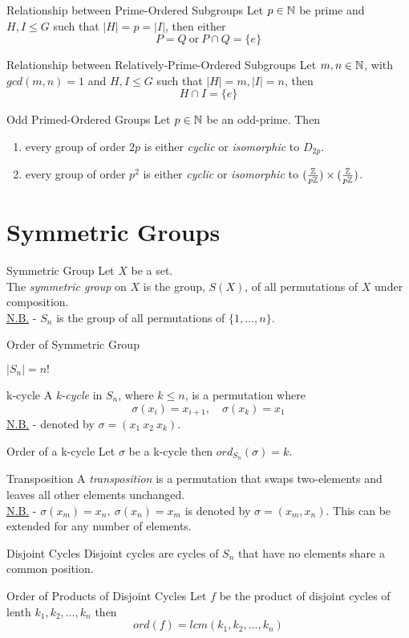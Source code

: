 \documentclass[11pt,a4paper]{article}
\begin{document}
\subtitle{Proposition 12.6 - }{Relationship between Prime-Ordered Subgroups}
Let $p \in \mathbb{N}$ be prime and $H, I \leq G$ such that $|H| = p = |I|$, then either
$$P = Q \mathrm{\ or \ } P \cap Q = \{e\} $$

\subtitle{Proposition 12.7 - }{Relationship between Relatively-Prime-Ordered Subgroups}
Let $m, n \in \mathbb{N}$, with $gcd(m,n) = 1$ and $H, I \leq G$ such that $|H| = m, |I| = n$, then
$$H \cap I = \{e\}$$

\subtitle{Theorem 12.8 - }{Odd Primed-Ordered Groups}
Let $p \in \mathbb{N}$ be an odd-prime. Then
\begin{enumerate}[label=\roman*)]
  \item every group of order $2p$ is either \textit{cyclic} or \textit{isomorphic} to $D_{2p}$.
  \item every group of order $p^2$ is either \textit{cyclic} or \textit{isomorphic} to $(\frac{\mathbb{Z}}{p\mathbb{Z}}) \times (\frac{\mathbb{Z}}{p\mathbb{Z}})$.
\end{enumerate}

\section{Symmetric Groups}

\subtitle{Definition 13.1 - }{Symmetric Group}
Let $X$ be a set.\\
The \textit{symmetric group} on $X$ is the group, $S(X)$, of all permutations of $X$ under composition.\\
\underline{N.B.} - $S_n$ is the group of all permutations of $\{1 , \dots , n\}$.\\

\subtitle{Proposition 13.2 - }{Order of Symmetric Group}
\begin{center} $|S_n| = n!$ \end{center}

\subtitle{Definition 13.3 - }{k-cycle}
A \textit{k-cycle} in $S_n$, where $k \leq n$, is a permutation where
$$\sigma(x_i) = x_{i+1},\quad \sigma(x_k) = x_1$$
\underline{N.B.} - denoted by $\sigma = (x_1\ x_2\ x_k)$.\\

\subtitle{Theorem 13.4 - }{Order of a k-cycle}
Let $\sigma$ be a k-cycle then $ord_{S_n}(\sigma) = k$.\\

\subtitle{Definition 13.5 - }{Transposition}
A \textit{transposition} is a permutation that swaps two-elements and leaves all other elements unchanged.\\
\underline{N.B.} - $\sigma(x_m) = x_n,\ \sigma(x_n) = x_m$ is denoted by $\sigma = (x_m, x_n)$. This can be extended for any number of elements.\\

\subtitle{Definition 13.6 - }{Disjoint Cycles}
Disjoint cycles are cycles of $S_n$ that have no elements share a common position.\\

\subtitle{Theorem 13.7 - }{Order of Products of Disjoint Cycles}
Let $f$ be the product of disjoint cycles of lenth $k_1, k_2, \dots , k_n$ then
$$ord(f) = lcm(k_1, k_2, \dots , k_n)$$
\end{document}
